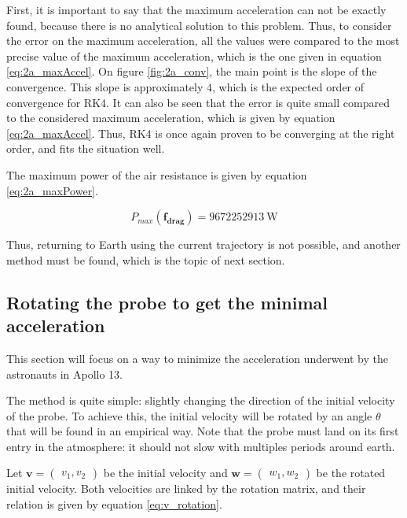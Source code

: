 \documentclass[a4paper,12pt,twoside]{article}
\begin{document}
First, it is important to say that the maximum acceleration can not be exactly found, because there is no analytical solution to this problem.
Thus, to consider the error on the maximum acceleration, all the values were compared to the most precise value of the maximum acceleration, which is the one given in equation \eqref{eq:2a_maxAccel}.
On figure \ref{fig:2a_conv}, the main point is the slope of the convergence.
This slope is approximately $4$, which is the expected order of convergence for RK4.
It can also be seen that the error is quite small compared to the considered maximum acceleration, which is given by equation \eqref{eq:2a_maxAccel}.
Thus, RK4 is once again proven to be converging at the right order, and fits the situation well.

The maximum power of the air resistance is given by equation \eqref{eq:2a_maxPower}.

\begin{equation}
  P_{max}(\mathbf{f_\text{drag}}) = \SI{9672252913}{\watt} %
  \label{eq:2a_maxPower}
\end{equation}


Thus, returning to Earth using the current trajectory is not possible, and another method must be found, which is the topic of next section.


\subsection{Rotating the probe to get the minimal acceleration}
This section will focus on a way to minimize the acceleration underwent by the astronauts in Apollo 13.

The method is quite simple: slightly changing the direction of the initial velocity of the probe.
To achieve this, the initial velocity will be rotated by an angle $\theta$ that will be found in an empirical way.
Note that the probe must land on its first entry in the atmosphere: it should not slow with multiples periods around earth. %

Let $\mathbf{v} = \begin{pmatrix} v_1, v_2\end{pmatrix}$ be the initial velocity and $\mathbf{w} = \begin{pmatrix} w_1, w_2\end{pmatrix}$ be the rotated initial velocity.
Both velocities are linked by the rotation matrix, and their relation is given by equation \eqref{eq:v_rotation}.
\end{document}
